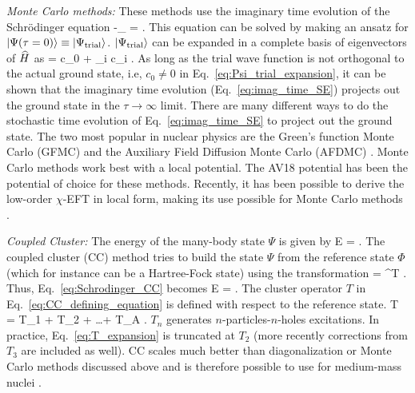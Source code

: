 	\li
	\emph{Monte Carlo methods:}
	These methods use the imaginary time evolution of the Schr\"{o}dinger
	equation
	\beq
	-\partial_\tau \ket{\Psi(\tau)} =  \ket{\Psi(\tau)} \;.
	\label{eq:imag_time_SE}
	\eeq
	This equation can be solved by making an ansatz for
	${|\Psi(\tau = 0)\rangle} \equiv {|\Psi_{\rm trial}\rangle}$.
	${|\Psi_{\rm trial}\rangle}$ can be expanded in a complete basis of eigenvectors
	of $\widehat{H}$ as
	\beq
	 = c_0  +
	\sum_{i } c_i  \;.
	\label{eq:Psi_trial_expansion}
	\eeq
	As long as the trial wave function is not orthogonal to the actual ground
	state, i.e, $c_0 \neq 0$ in Eq.~\eqref{eq:Psi_trial_expansion}, it can
	be shown that the imaginary time evolution (Eq.~\eqref{eq:imag_time_SE})
	projects out the ground state in the $\tau \to \infty$ limit.  There are many
	different ways to do the stochastic time evolution of
	Eq.~\eqref{eq:imag_time_SE} to project out the ground state.  The two
	most popular in nuclear physics are the Green's function Monte Carlo (GFMC)
	\cite{Pieper:2002ne, Pieper:2007ax}
	and the Auxiliary Field Diffusion Monte Carlo (AFDMC)
	\cite{Gandolfi:2007hs, Gezerlis:2014zia}.  Monte Carlo methods
	work best with a local potential.  The AV18 potential has been the
	potential	of choice for these methods.  Recently, it has been possible to
	derive the low-order $\chi$-EFT in local form, making its use possible
	for Monte Carlo methods \cite{Gezerlis:2014zia}.

	\li
	\emph{Coupled Cluster:} The energy of the many-body state $\Psi$ is given
	by
	\beq
	E = \;.
	\label{eq:Schrodinger_CC}
	\eeq
	The coupled cluster (CC) method tries to build the state $\Psi$ from the
	reference state $\Phi$ (which for instance can be a Hartree-Fock state)
	using the transformation
	\beq
	\ket{\Psi} = \ee^T \ket{\Phi}\;.
	\label{eq:CC_defining_equation}
	\eeq
	Thus, Eq.~\eqref{eq:Schrodinger_CC} becomes
	\beq
	E = \;.
	\eeq
	The cluster operator $T$ in Eq.~\eqref{eq:CC_defining_equation}
	is defined with respect to the reference state.
	\beq
	T = T_1 + T_2 + \ldots + T_A \;.
	\label{eq:T_expansion}
	\eeq
	$T_n$ generates $n$-particles-$n$-holes excitations.  In practice,
	Eq.~\eqref{eq:T_expansion} is truncated at $T_2$
	(more recently corrections from $T_3$ are included as well).  CC
	scales much better than diagonalization or Monte Carlo methods discussed
	above and is therefore possible to use for medium-mass nuclei
	\cite{Hagen:2013nca}.

